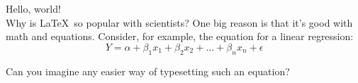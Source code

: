 \documentclass{article}
\begin{document}
Hello, world! \\

Why is \LaTeX\ so popular with scientists? One big reason is that it's good with math and equations. Consider, for example, the equation for a linear regression: $$Y = \alpha + \beta_1x_1 + \beta_2x_2 + \ldots + \beta_nx_n + \epsilon$$

Can you imagine any easier way of typesetting such an equation? \\
\end{document}
